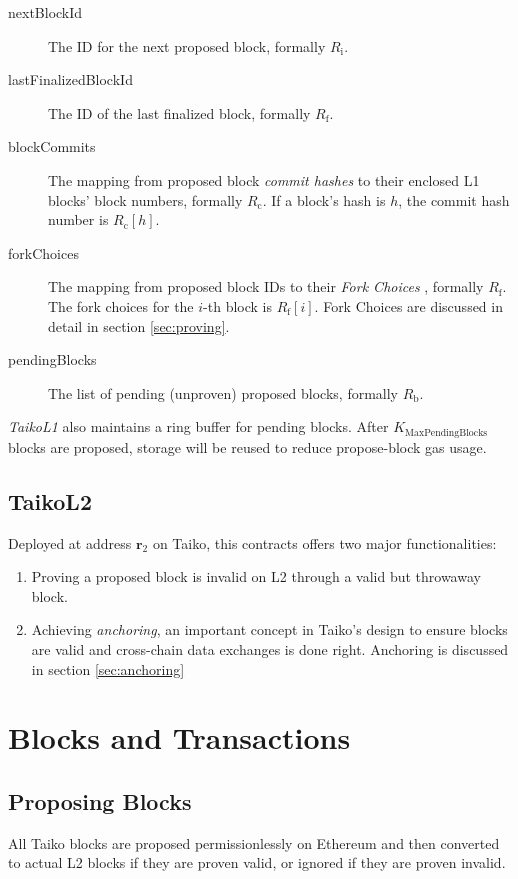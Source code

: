 \documentclass[9pt,oneside]{amsart}
\begin{document}
\begin{multicols}{2}
\begin{description}
\item[nextBlockId] The ID for the next proposed block, formally $R_\mathrm{i}$.
\item[lastFinalizedBlockId] The ID of the last finalized block, formally $R_\mathrm{f}$.
\item [blockCommits] The mapping from proposed block \textit{commit hashes} to their enclosed L1 blocks' block numbers, formally $R_\mathrm{c}$. If a block's hash is $h$, the commit hash number is $R_\mathrm{c}[h]$.
\item[forkChoices] The mapping from proposed block IDs to their \textit{Fork Choices} , formally $R_\mathrm{f}$. The fork choices for the $i$-th block is $R_\mathrm{f}[i]$. Fork Choices are discussed in detail in section \ref{sec:proving}.
\item[pendingBlocks] The list of pending (unproven) proposed blocks, formally $R_\mathrm{b}$.
\end{description}


\textit{TaikoL1} also maintains a ring buffer for pending blocks. After $K_{\mathrm{MaxPendingBlocks}}$ blocks are proposed, storage will be reused to reduce propose-block gas usage.

\subsection{TaikoL2} Deployed at address $\mathbf{r_{\mathrm{2}}}$ on Taiko, this contracts offers two major functionalities:
\begin{enumerate}
\item Proving a proposed block is invalid on L2 through a valid but throwaway block.
\item Achieving \textit{anchoring}, an important concept in Taiko's design to ensure blocks are valid and cross-chain data exchanges is done right. Anchoring is discussed in section \ref{sec:anchoring}
\end{enumerate}

\section{Blocks and Transactions}

\subsection{Proposing Blocks}
All Taiko blocks are proposed permissionlessly on Ethereum and then converted to actual L2 blocks if they are proven valid, or ignored if they are proven invalid.


\end{multicols}
\end{document}
